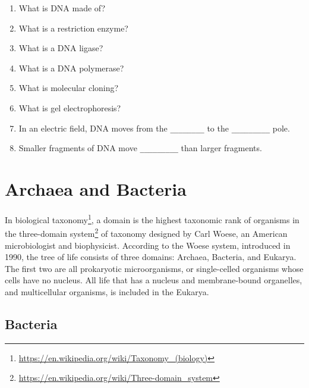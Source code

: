 \documentclass[]{book}
\providecommand{\tightlist}{%
  \setlength{\itemsep}{0pt}\setlength{\parskip}{0pt}}
\let\rmarkdownfootnote\footnote%
\def\footnote{\protect\rmarkdownfootnote}
\renewcommand{\href}[2]{#2\footnote{\url{#1}}}
\theoremstyle{definition}
\theoremstyle{definition}
\theoremstyle{definition}
\theoremstyle{remark}
\begin{document}
\begin{enumerate}
\def\labelenumi{\arabic{enumi}.}
\tightlist
\item
  What is DNA made of?
\item
  What is a restriction enzyme?
\item
  What is a DNA ligase?
\item
  What is a DNA polymerase?
\item
  What is molecular cloning?
\item
  What is gel electrophoresis?
\item
  In an electric field, DNA moves from the \texttt{\_\_\_\_\_\_\_\_} to
  the \texttt{\_\_\_\_\_\_\_\_\_} pole.
\item
  Smaller fragments of DNA move \texttt{\_\_\_\_\_\_\_\_\_} than larger
  fragments.
\end{enumerate}

\chapter{Archaea and Bacteria}\label{archaea-and-bacteria}

In biological
\href{https://en.wikipedia.org/wiki/Taxonomy_(biology)}{taxonomy}, a
domain is the highest taxonomic rank of organisms in the
\href{https://en.wikipedia.org/wiki/Three-domain_system}{three-domain
system} of taxonomy designed by Carl Woese, an American microbiologist
and biophysicist. According to the Woese system, introduced in 1990, the
tree of life consists of three domains: Archaea, Bacteria, and Eukarya.
The first two are all prokaryotic microorganisms, or single-celled
organisms whose cells have no nucleus. All life that has a nucleus and
membrane-bound organelles, and multicellular organisms, is included in
the Eukarya.

\section{Bacteria}\label{bacteria}
\end{document}

